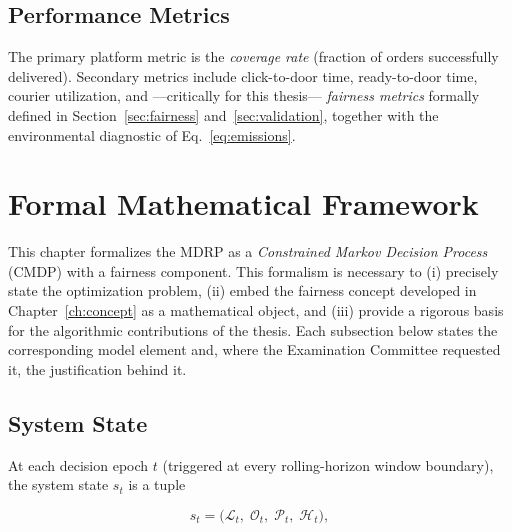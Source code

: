 \documentclass[12pt,a4paper]{report}
\begin{document}
\section{Performance Metrics}
\label{sec:metrics}

The primary platform metric is the \emph{coverage rate} (fraction of orders successfully delivered). Secondary metrics include click-to-door time, ready-to-door time, courier utilization, and ---critically for this thesis--- \emph{fairness metrics} formally defined in Section~\ref{sec:fairness} and~\ref{sec:validation}, together with the environmental diagnostic of Eq.~\eqref{eq:emissions}.

\chapter{Formal Mathematical Framework}
\label{ch:formal}
\label{sec:formal}

This chapter formalizes the MDRP as a \emph{Constrained Markov Decision Process} (CMDP) with a fairness component. This formalism is necessary to (i) precisely state the optimization problem, (ii) embed the fairness concept developed in Chapter~\ref{ch:concept} as a mathematical object, and (iii) provide a rigorous basis for the algorithmic contributions of the thesis. Each subsection below states the corresponding model element and, where the Examination Committee requested it, the justification behind it.

\section{System State}
\label{sec:state}

At each decision epoch $t$ (triggered at every rolling-horizon window boundary), the system state $s_t$ is a tuple

\begin{equation}
    s_t = \bigl(\mathcal{L}_t,\; \mathcal{O}_t,\; \mathcal{P}_t,\; \mathcal{H}_t\bigr),
\end{equation}
\end{document}
